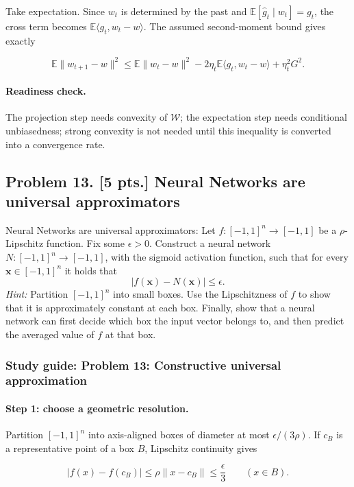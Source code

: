 \documentclass[11pt,a4paper]{article}
\begin{document}
Take expectation. Since $w_t$ is determined by the past and $\mathbb{E}[\hat g_t\mid w_t]=g_t$, the cross term becomes $\mathbb{E}\langle g_t,w_t-w\rangle$. The assumed second-moment bound gives exactly

\[
\mathbb{E}\|w_{t+1}-w\|^2
\leq
\mathbb{E}\|w_t-w\|^2
-2\eta_t\mathbb{E}\langle g_t,w_t-w\rangle
+\eta_t^2G^2.
\]

\paragraph{Readiness check.}

The projection step needs convexity of $\mathcal{W}$; the expectation step needs conditional unbiasedness; strong convexity is not needed until this inequality is converted into a convergence rate.



\subsection{Problem 13. [5 pts.] Neural Networks are universal approximators}
Neural Networks are universal approximators: Let $f : [-1, 1]^{n} \to [-1, 1]$ be a $\rho$-Lipschitz function. Fix some $\epsilon > 0$. Construct a neural network $N : [-1, 1]^{n} \to [-1, 1]$, with the sigmoid activation function, such that for every $\mathbf{x} \in [-1, 1]^{n}$ it holds that
\[
|f(\mathbf{x}) - N(\mathbf{x})| \le \epsilon.
\]
\textit{Hint:} Partition $[-1, 1]^{n}$ into small boxes. Use the Lipschitzness of $f$ to show that it is approximately constant at each box. Finally, show that a neural network can first decide which box the input vector belongs to, and then predict the averaged value of $f$ at that box.


\subsubsection{Study guide: Problem 13: Constructive universal approximation}

\paragraph{Step 1: choose a geometric resolution.}

Partition $[-1,1]^n$ into axis-aligned boxes of diameter at most $\epsilon/(3\rho)$. If $c_B$ is a representative point of a box $B$, Lipschitz continuity gives

\[
|f(x)-f(c_B)|
\leq
\rho\|x-c_B\|
\leq
\frac{\epsilon}{3}
\qquad (x\in B).
\]
\end{document}
